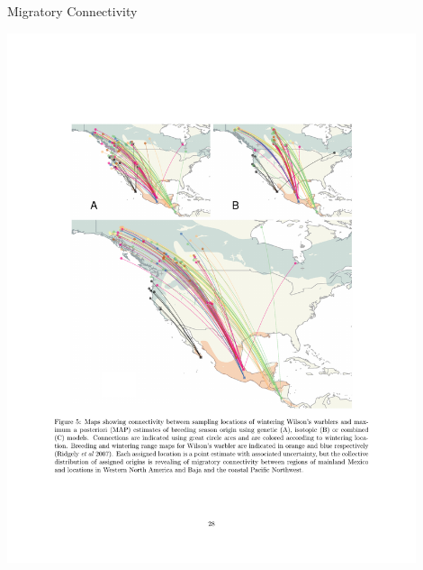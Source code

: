 \documentclass[11pt,ignorenonframetext,]{beamer}
\begin{document}
\begin{frame}{Migratory Connectivity}

\begin{center}
\includegraphics[width=0.9\textwidth]{figs/wintering.pdf}
\end{center}

\end{frame}
\end{document}
